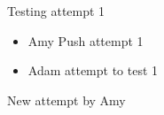 \documentclass[10pt]{article}
\begin{document}
Testing attempt 1
\begin{itemize}
  \item Amy Push attempt 1
  \item Adam attempt to test 1
\end{itemize}

New attempt by Amy
\end{document}
